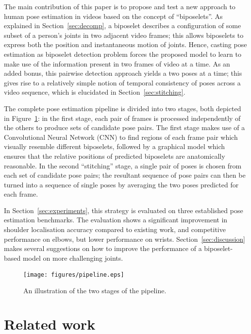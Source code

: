 \documentclass[runningheads]{llncs}
\begin{document}
The main contribution of this paper is to propose and test a new approach to
human pose estimation in videos based on the concept of ``biposelets''. As
explained in Section~\ref{sec:decomp}, a biposelet describes a configuration of
some subset of a person's joints in two adjacent video frames; this allows
biposelets to express both the position and instantaneous motion of joints.
Hence, casting pose estimation as biposelet detection problem forces the
proposed model to learn to make use of the information present in two frames of
video at a time. As an added bonus, this pairwise detection approach yields a
two poses at a time; this gives rise to a relatively simple notion of temporal
consistency of poses across a video sequence, which is elucidated in
Section~\ref{sec:stitching}.

The complete pose estimation pipeline is divided into two stages, both depicted
in Figure~\ref{fig:pipeline}: in the first stage, each pair of frames is
processed independently of the others to produce sets of candidate pose pairs.
The first stage makes use of a Convolutional Neural Network (CNN) to find
regions of each frame pair which visually resemble different biposelets,
followed by a graphical model which ensures that the relative positions of
predicted biposelets are anatomically reasonable. In the second ``stitching''
stage, a single pair of poses is chosen from each set of candidate pose pairs;
the resultant sequence of pose pairs can then be turned into a sequence of
single poses by averaging the two poses predicted for each frame.

In Section~\ref{sec:experiments}, this strategy is evaluated on three
established pose estimation benchmarks. The evaluation shows a significant
improvement in shoulder localisation accuracy compared to existing work, and
competitive performance on elbows, but lower performance on wrists.
Section~\ref{sec:discussion} makes several suggestions on how to improve the
performance of a biposelet-based model on more challenging joints.

\begin{figure}[t]
\begin{center}
\texttt{[image: figures/pipeline.eps]}
\end{center}
\vspace{-7mm}
\caption{An illustration of the two stages of the pipeline.}
\label{fig:pipeline}
\end{figure}

\section{Related work}\label{sec:related-work}
\end{document}
